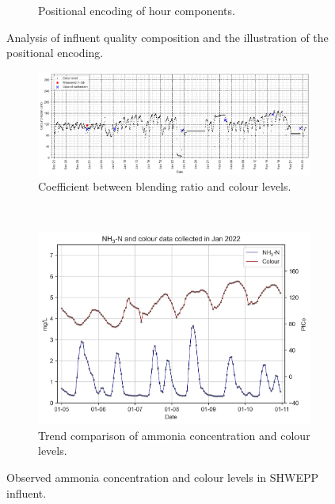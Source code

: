\begin{figure}[!ht]
\begin{subfigure}[t]{0.5\textwidth}
      \caption{Positional encoding of hour components.} \label{fig:pos-encoding}
    \end{subfigure}%
  \caption{Analysis of influent quality composition and the illustration of the positional encoding.} \label{fig:blend-pos}
\end{figure}


\begin{figure}[!ht]
    \centering
    \begin{subfigure}[t]{0.7\textwidth}
        \includegraphics[width=\linewidth]{imgs/leachate-effluent-blend-ratio-color-plot/colour-blend-coef.png}
        \caption{Coefficient between blending ratio and colour levels.} \label{fig:blend-colour-coef}
      \end{subfigure}\\
      \hspace{2em}
    \begin{subfigure}[t]{0.7\textwidth}
        \includegraphics[width=\linewidth]{imgs/results/colour-pattern.png}
        \caption{Trend comparison of ammonia concentration and colour levels.} \label{fig:color-to-nh3-pattern}
      \end{subfigure}%
  \caption{Observed ammonia concentration and colour levels in SHWEPP influent.} \label{fig:observation-shweep-influent}
\end{figure}

